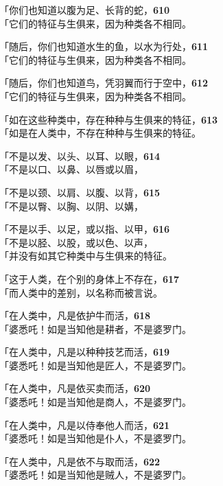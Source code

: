 「你们也知道以腹为足、长背的蛇，\hfill{\grayfootnotesize \textbf{610}} \\
「它们的特征与生俱来，因为种类各不相同。


「随后，你们也知道水生的鱼，以水为行处，\hfill{\grayfootnotesize \textbf{611}} \\
「它们的特征与生俱来，因为种类各不相同。


「随后，你们也知道鸟，凭羽翼而行于空中，\hfill{\grayfootnotesize \textbf{612}} \\
「它们的特征与生俱来，因为种类各不相同。


「如在这些种类中，存在种种与生俱来的特征，\hfill{\grayfootnotesize \textbf{613}} \\
「如是在人类中，不存在种种与生俱来的特征。


「不是以发、以头、以耳、以眼，\hfill{\grayfootnotesize \textbf{614}} \\
「不是以口、以鼻、以唇或以眉，


「不是以颈、以肩、以腹、以背，\hfill{\grayfootnotesize \textbf{615}} \\
「不是以臀、以胸、以阴、以媾，

「不是以手、以足，或以指、以甲，\hfill{\grayfootnotesize \textbf{616}} \\
「不是以胫、以股，或以色、以声，\\
「并没有如其它种类中与生俱来的特征。


「这于人类，在个别的身体上不存在，\hfill{\grayfootnotesize \textbf{617}} \\
「而人类中的差别，以名称而被言说。


「在人类中，凡是依护牛而活，\hfill{\grayfootnotesize \textbf{618}} \\
「婆悉吒！如是当知他是耕者，不是婆罗门。


「在人类中，凡是以种种技艺而活，\hfill{\grayfootnotesize \textbf{619}} \\
「婆悉吒！如是当知他是匠人，不是婆罗门。


「在人类中，凡是依买卖而活，\hfill{\grayfootnotesize \textbf{620}} \\
「婆悉吒！如是当知他是商人，不是婆罗门。

「在人类中，凡是以侍奉他人而活，\hfill{\grayfootnotesize \textbf{621}} \\
「婆悉吒！如是当知他是仆人，不是婆罗门。

「在人类中，凡是依不与取而活，\hfill{\grayfootnotesize \textbf{622}} \\
「婆悉吒！如是当知他是贼人，不是婆罗门。

